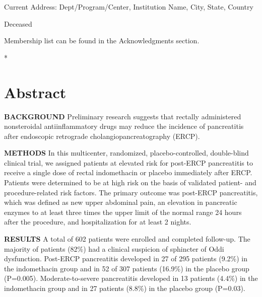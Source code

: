 \documentclass[
  10pt,
  letterpaper,
]{article}
\begin{document}
\begin{flushleft}

\textcurrency Current Address: Dept/Program/Center, Institution Name, City, State, Country %

\dag Deceased

\textpilcrow Membership list can be found in the Acknowledgments section.

* 

\end{flushleft}

\section*{Abstract}
\textbf{BACKGROUND} Preliminary research suggests that rectally
administered nonsteroidal antiinflammatory drugs may reduce the
incidence of pancreatitis after endoscopic retrograde
cholangiopancreatography (ERCP).

\textbf{METHODS} In this multicenter, randomized, placebo-controlled,
double-blind clinical trial, we assigned patients at elevated risk for
post-ERCP pancreatitis to receive a single dose of rectal indomethacin
or placebo immediately after ERCP. Patients were determined to be at
high risk on the basis of validated patient- and procedure-related risk
factors. The primary outcome was post-ERCP pancreatitis, which was
defined as new upper abdominal pain, an elevation in pancreatic enzymes
to at least three times the upper limit of the normal range 24 hours
after the procedure, and hospitalization for at least 2 nights.

\textbf{RESULTS} A total of 602 patients were enrolled and completed
follow-up. The majority of patients (82\%) had a clinical suspicion of
sphincter of Oddi dysfunction. Post-ERCP pancreatitis developed in 27 of
295 patients (9.2\%) in the indomethacin group and in 52 of 307 patients
(16.9\%) in the placebo group (P=0.005). Moderate-to-severe pancreatitis
developed in 13 patients (4.4\%) in the indomethacin group and in 27
patients (8.8\%) in the placebo group (P=0.03).
\end{document}
